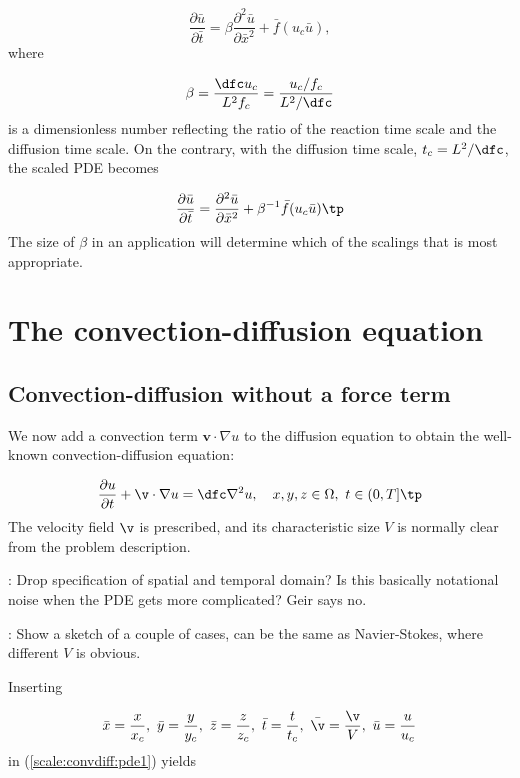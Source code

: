 \documentclass[graybox,envcountchap,sectrefs,final]{svmonodo}
\newcommand{\longinlinecomment}[3]{{\color{red}{\bf #1}: #2}}
\begin{document}
\begin{equation}
\frac{\partial\bar u}{\partial\bar t} =
\beta\frac{\partial^2\bar u}{\partial\bar x^2} + \bar f(u_c\bar u),
\end{equation}
where

\[ \beta = \frac{\dfc u_c}{L^2 f_c} = \frac{u_c/f_c}{L^2/\dfc}\]
is a dimensionless number reflecting the ratio of the reaction time
scale and the diffusion time scale. On the contrary,
with the
diffusion time scale, $t_c=L^2/\dfc$, the scaled PDE becomes

\begin{equation}
\frac{\partial\bar u}{\partial\bar t} =
\frac{\partial^2\bar u}{\partial \bar x^2} + \beta^{-1}\bar f(u_c\bar u)\tp
\end{equation}
The size of $\beta$ in an application will determine which of the scalings
that is most appropriate.


\section{The convection-diffusion equation}
\label{scale:convdiff}

\subsection{Convection-diffusion without a force term}


We now add a convection term $\bm{v}\cdot\nabla u$ to the diffusion
equation to obtain the well-known convection-diffusion equation:

\begin{equation}
\frac{\partial u}{\partial t} + \v\cdot\nabla u =
\dfc\nabla^2 u,
\quad  x,y, z\in \Omega,\ t\in (0, T]\tp
\label{scale:convdiff:pde1}
\end{equation}
The velocity field $\v$ is prescribed, and its characteristic size $V$
is normally clear from the problem description.

\longinlinecomment{hpl 16}{ Drop specification of spatial and temporal domain? Is this basically notational noise when the PDE gets more complicated? Geir says no. }{ Drop specification of spatial }

\longinlinecomment{hpl 17}{ Show a sketch of a couple of cases, can be the same as Navier-Stokes, where different $V$ is obvious. }{ Show a sketch of }

Inserting

\[ \bar x = \frac{x}{x_c},\ \bar y = \frac{y}{y_c},\ \bar z = \frac{z}{z_c},
\ \bar t = \frac{t}{t_c}, \ \bar\v = \frac{\v}{V},
\ \bar u =\frac{u}{u_c}\]
in (\ref{scale:convdiff:pde1}) yields
\end{document}
